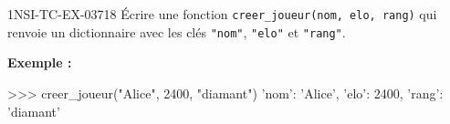 \begin{exercice}{1NSI-TC-EX-037}{1}{8}
Écrire une fonction \lstinline{creer_joueur(nom, elo, rang)} qui renvoie un
dictionnaire avec les clés \lstinline{"nom"}, \lstinline{"elo"} et \lstinline{"rang"}.

\textbf{Exemple :}
\begin{console}
>>> creer_joueur("Alice", 2400, "diamant")
{'nom': 'Alice', 'elo': 2400, 'rang': 'diamant'}
\end{console}
\end{exercice}
